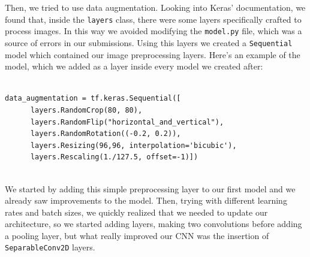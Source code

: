 \documentclass[a4paper,12pt]{article}
\newcommand{\code}[1]{\texttt{#1}}
\numberwithin{equation}{section}
\begin{document}
Then, we tried to use data augmentation. Looking into Keras' documentation, we found that, inside the \code{layers} class, there were some layers specifically crafted to process images. In this way we avoided modifying the \code{model.py} file, which was a source of errors in our submissions. Using this layers we created a \code{Sequential} model which contained our image preprocessing layers. Here's an example of the model, which we added as a layer inside every model we created after:
\begin{verbatim}
    
data_augmentation = tf.keras.Sequential([
      layers.RandomCrop(80, 80),
      layers.RandomFlip("horizontal_and_vertical"),
      layers.RandomRotation((-0.2, 0.2)),
      layers.Resizing(96,96, interpolation='bicubic'),
      layers.Rescaling(1./127.5, offset=-1)])
  
\end{verbatim}
We started by adding this simple preprocessing layer to our first model and we already saw improvements to the model. Then, trying with different learning rates and batch sizes, we quickly realized that we needed to update our architecture, so we started adding layers, making two convolutions before adding a pooling layer, but what really improved our CNN was the insertion of \code{SeparableConv2D} layers. 
\end{document}
